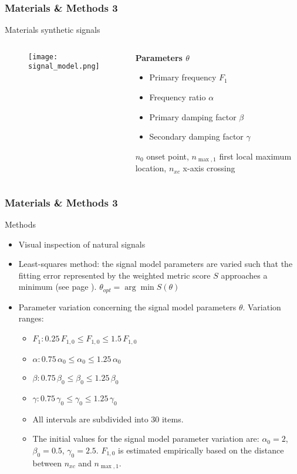 	\begin{frame}
		\frametitle{Materials \& Methods 3}\label{mm:sigmodplot}
		\textcolor{RIPtitlecol}{Materials \textendash{} synthetic signals}
		\begin{columns}[t]
			\begin{RIPcolleft}
				\begin{figure}
					\texttt{[image: signal\_model.png]}
				\end{figure}
			\end{RIPcolleft}
			\begin{RIPcolright}
				\textbf{Parameters $\theta$}\\
				\begin{itemize}
					\item Primary frequency $F_1$
					\item Frequency ratio $\alpha$
					\item Primary damping factor $\beta$
					\item Secondary damping factor $\gamma$
				\end{itemize}
				$n_0$ \textellipsis{} onset point, $n_{\max,1}$ \textellipsis{} first local maximum location, $n_{xc}$ \textellipsis x-axis crossing
			\end{RIPcolright}
		\end{columns}
	\end{frame}

	\begin{frame}
		\frametitle{Materials \& Methods 3}\label{mm:paramvar}
		\textcolor{RIPtitlecol}{Methods}
		\begin{itemize}
			\item Visual inspection of natural signals
			\item Least-squares method: the signal model parameters are varied such that the fitting error represented by the weighted metric score $S$ approaches a minimum (see page \pageref{mm:error}). $\theta_{opt} = \arg \min S(\theta)$
			\item Parameter variation concerning the signal model parameters $\theta$. Variation ranges:%
			\begin{itemize}
				\item $F_1: 0.25 \, F_{1,0} \leq F_{1,0} \leq 1.5 \, F_{1,0}$
				\item $\alpha: 0.75 \, \alpha_0 \leq \alpha_0 \leq 1.25 \, \alpha_0$
				\item $\beta: 0.75 \, \beta_0 \leq \beta_0 \leq 1.25 \, \beta_0$
				\item $\gamma: 0.75 \, \gamma_0 \leq \gamma_0 \leq 1.25 \, \gamma_0$
				\item All intervals are subdivided into 30 items.
				\item The initial values for the signal model parameter variation are: $\alpha_0 = 2$, $\beta_0 = 0.5$, $\gamma_0 = 2.5$. $F_{1,0}$ is estimated empirically based on the distance between $n_{xc}$ and $n_{\max,1}$.
			\end{itemize}
		\end{itemize}
	\end{frame}

